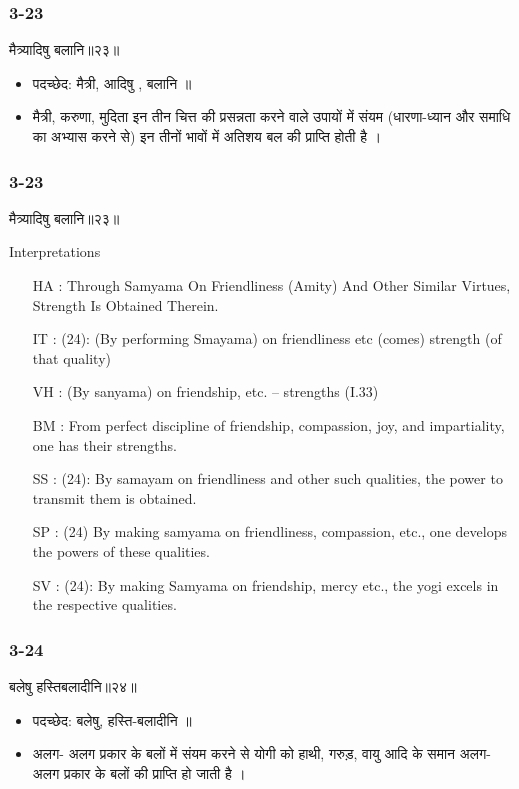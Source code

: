 \begin{frame}[fragile]\frametitle{3-23}
\begin{sanskrit}
मैत्र्यादिषु बलानि॥२३॥
\end{sanskrit}

\begin{itemize}
\item पदच्छेद:  मैत्री, आदिषु , बलानि ॥
\item मैत्री, करुणा, मुदिता इन तीन चित्त की प्रसन्नता करने वाले उपायों में संयम (धारणा-ध्यान और समाधि का अभ्यास करने से) इन तीनों भावों में अतिशय बल की प्राप्ति होती है ।
\end{itemize}
\end{frame}


\begin{frame}[fragile]\frametitle{3-23}
\begin{sanskrit}
मैत्र्यादिषु बलानि॥२३॥
\end{sanskrit}

Interpretations
\begin{itemize}	
\item [HA]: Through Samyama On Friendliness (Amity) And Other Similar Virtues, Strength Is Obtained Therein.
\item [IT]: (24): (By performing Smayama) on friendliness etc (comes) strength (of that quality)
\item [VH]: (By sanyama) on friendship, etc. – strengths (I.33)
\item [BM]: From perfect discipline of friendship, compassion, joy, and impartiality, one has their strengths.
\item [SS]: (24): By samayam on friendliness and other such qualities, the power to transmit them is obtained.
\item [SP]: (24) By making samyama on friendliness, compassion, etc., one develops the powers of these qualities.
\item [SV]: (24): By making Samyama on friendship, mercy etc., the yogi excels in the respective qualities.
\end{itemize}
\end{frame}


\begin{frame}[fragile]\frametitle{3-24}
\begin{sanskrit}
बलेषु हस्तिबलादीनि॥२४॥
\end{sanskrit}

\begin{itemize}
\item पदच्छेद:  बलेषु, हस्ति-बलादीनि‌ ‌॥
\item अलग- अलग प्रकार के बलों में संयम करने से योगी को हाथी, गरुड़, वायु आदि के समान अलग- अलग प्रकार के बलों की प्राप्ति हो जाती है ।
\end{itemize}
\end{frame}


